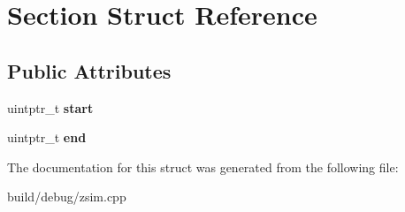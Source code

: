 \hypertarget{structSection}{\section{Section Struct Reference}
\label{structSection}
}
\subsection*{Public Attributes}
\begin{DoxyCompactItemize}
\item 
\hypertarget{structSection_abb0118ec507ba7f2c6151659c2abfbfd}{uintptr\-\_\-t {\bfseries start}}\label{structSection_abb0118ec507ba7f2c6151659c2abfbfd}

\item 
\hypertarget{structSection_af86cddd60f8955c1ca2608c550753abe}{uintptr\-\_\-t {\bfseries end}}\label{structSection_af86cddd60f8955c1ca2608c550753abe}

\end{DoxyCompactItemize}


The documentation for this struct was generated from the following file\-:\begin{DoxyCompactItemize}
\item 
build/debug/zsim.\-cpp\end{DoxyCompactItemize}
